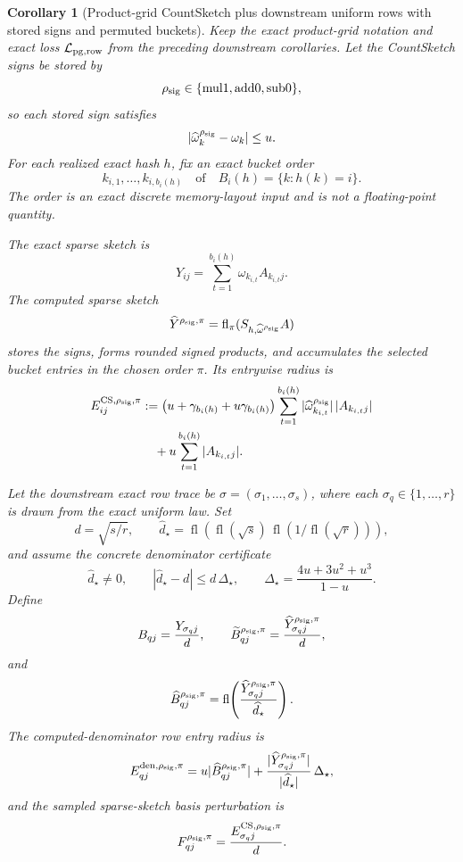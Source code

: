 \documentclass[11pt]{article}
\newcommand{\fl}{\operatorname{fl}}
\newtheorem{corollary}[theorem]{Corollary}
\theoremstyle{remark}
\begin{document}
\begin{corollary}[Product-grid CountSketch plus downstream uniform rows with stored signs and permuted buckets]
Keep the exact product-grid notation and exact loss
\(\mathcal L_{\rm pg,row}\) from the preceding downstream corollaries.  Let
the CountSketch signs be stored by
\[
  \rho_{\rm sig}\in\{\mathrm{mul1},\mathrm{add0},\mathrm{sub0}\},
\]
so each stored sign satisfies
\[
  |\widehat\omega_k^{\rho_{\rm sig}}-\omega_k|\le u .
\]
For each realized exact hash \(h\), fix an exact bucket order
\[
  k_{i,1},\ldots,k_{i,b_i(h)}
  \quad\text{of}\quad
  B_i(h)=\{k:h(k)=i\}.
\]
The order is an exact discrete memory-layout input and is not a
floating-point quantity.

The exact sparse sketch is
\[
  Y_{ij}
  =
  \sum_{t=1}^{b_i(h)}\omega_{k_{i,t}}A_{k_{i,t}j}.
\]
The computed sparse sketch
\[
  \widehat Y^{\rho_{\rm sig},\pi}
  =
  \fl_\pi(S_{h,\widehat\omega^{\rho_{\rm sig}}}A)
\]
stores the signs, forms rounded signed products, and accumulates the selected
bucket entries in the chosen order \(\pi\).  Its entrywise radius is
\[
\begin{aligned}
  E^{{\rm CS},\rho_{\rm sig},\pi}_{ij}
  &:=
  \bigl(u+\gamma_{b_i(h)}+u\gamma_{b_i(h)}\bigr)
  \sum_{t=1}^{b_i(h)}
    |\widehat\omega^{\rho_{\rm sig}}_{k_{i,t}}|\,|A_{k_{i,t}j}|
  \\
  &\quad+
  u\sum_{t=1}^{b_i(h)}|A_{k_{i,t}j}|.
\end{aligned}
\]

Let the downstream exact row trace be
\(\sigma=(\sigma_1,\ldots,\sigma_s)\), where each
\(\sigma_q\in\{1,\ldots,r\}\) is drawn from the exact uniform law.  Set
\[
  d=\sqrt{s/r},
  \qquad
  \widehat d_\star
  =
  \fl\!\left(
    \fl(\sqrt{s})\,\fl(1/\fl(\sqrt r))
  \right),
\]
and assume the concrete denominator certificate
\[
  \widehat d_\star\ne0,\qquad
  |\widehat d_\star-d|
  \le
  d\,\Delta_\star,
  \qquad
  \Delta_\star=\frac{4u+3u^2+u^3}{1-u}.
\]
Define
\[
  B_{qj}=\frac{Y_{\sigma_qj}}{d},
  \qquad
  \widetilde B^{\rho_{\rm sig},\pi}_{qj}
  =
  \frac{\widehat Y^{\rho_{\rm sig},\pi}_{\sigma_qj}}{d},
\]
and
\[
  \widehat B^{\rho_{\rm sig},\pi}_{qj}
  =
  \fl\!\left(
    \frac{\widehat Y^{\rho_{\rm sig},\pi}_{\sigma_qj}}
         {\widehat d_\star}
  \right).
\]
The computed-denominator row entry radius is
\[
  E^{{\rm den},\rho_{\rm sig},\pi}_{qj}
  =
  u|\widehat B^{\rho_{\rm sig},\pi}_{qj}|
  +
  \frac{|\widehat Y^{\rho_{\rm sig},\pi}_{\sigma_qj}|}
       {|\widehat d_\star|}\,\Delta_\star ,
\]
and the sampled sparse-sketch basis perturbation is
\[
  F^{\rho_{\rm sig},\pi}_{qj}
  =
  \frac{E^{{\rm CS},\rho_{\rm sig},\pi}_{\sigma_qj}}{d}.
\]


\end{corollary}
\end{document}
